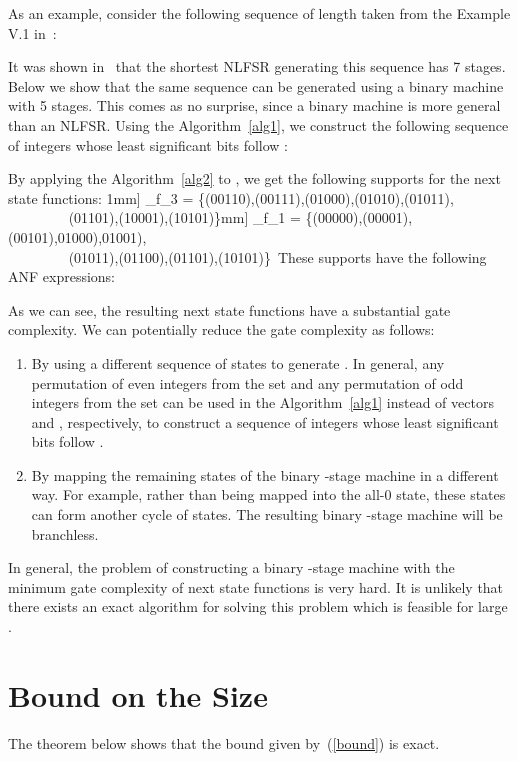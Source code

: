 \documentclass[twocolumn]{IEEEtran} \usepackage{epsfig}
\begin{document}
As an example, consider the following sequence of length  taken from the Example V.1 in~\cite{LiKK07}:

It was shown in~\cite{LiKK07} that the shortest NLFSR generating this sequence has 7
stages. Below we show that the same sequence can be
generated using a binary machine with 5 stages. This comes as no surprise, since a binary machine is more general than an NLFSR. Using the Algorithm~\ref{alg1}, we construct the following sequence 
of integers whose least significant bits
follow :

By applying the Algorithm~\ref{alg2} to , we get the following supports for the next state functions:
1mm]
\Omega_{f_3}  =   \{(00110),(00111),(01000),(01010),(01011),\\
~~~~~~~~  (01101),(10001),(10101)\}\1mm]
\Omega_{f_1}  =   \{(00000),(00001),(00101),01000),01001),\\
~~~~~~~~  (01011),(01100),(01101),(10101)\}\
These supports have the following ANF expressions:


As we can see, the resulting next state functions have a substantial gate complexity. We can potentially reduce the gate complexity as follows:
\begin{enumerate}
\item By using a different sequence of states to generate . In general, any permutation of even integers from the set  and any permutation of odd integers from the set  can be used in the Algorithm~\ref{alg1} instead of vectors  and , respectively, to construct a sequence of integers whose least significant bits follow .
\item By mapping the remaining  states of the binary -stage machine in a different way.
For example, rather than being mapped into the all-0 state, these states can form another cycle of states.
The resulting binary -stage machine will be branchless.
\end{enumerate}

In general, the problem of constructing a binary -stage machine with the minimum gate complexity 
of next state functions is very hard. It is unlikely that there exists an exact algorithm for solving this problem 
which is feasible for large .

\section{Bound on the Size}

The theorem below shows that the bound given by~(\ref{bound}) is exact.
\end{document}
